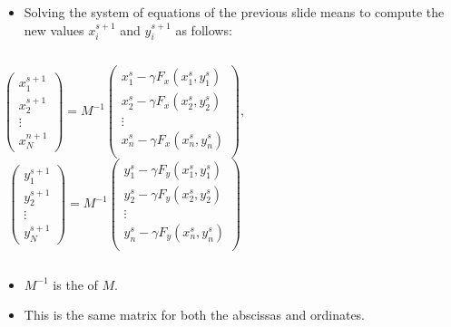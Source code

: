 \documentclass[10pt]{beamer}
\newcommand{\myemph}[1]{{\color{blue}{#1}}}
\begin{document}
 \begin{frame}
   \begin{itemize}
   \item Solving the system of equations of the previous slide means to compute the new
     values $x_i^{s+1}$ and $y_i^{s+1}$ as follows:
   \end{itemize}
   \begin{columns}
     {\small $$
       \begin{pmatrix}
         x^{s+1}_1\\x^{s+1}_2\\\vdots\\x^{n+1}_N
       \end{pmatrix}
       = M ^{-1} \begin{pmatrix}
         x^{s}_1 - \gamma F_x(x_1^{s},y_1^{s})\\
         x^{s}_2 - \gamma F_x(x_2^{s},y_2^{s})\\
         \vdots\\
         x^{s}_n - \gamma F_x(x_n^{s},y_n^{s})\\
       \end{pmatrix},
       $$}
     {\small $$ 
       \begin{pmatrix}
         y^{s+1}_1\\y^{s+1}_2\\\vdots\\y^{s+1}_N
       \end{pmatrix}
       = M^{-1} \begin{pmatrix}
         y^{s}_1 - \gamma F_y(x_1^{s},y_1^{s})\\
         y^{s}_2 - \gamma F_y(x_2^{s},y_2^{s})\\
         \vdots\\
         y^{s}_n - \gamma F_y(x_n^{s},y_n^{s})\\
       \end{pmatrix}
       $$}
   \end{columns}
   \begin{itemize}
   \item $M^{-1}$ is the \myemph{inverse matrix} of $M$.
   \item This is the same matrix for both the abscissas and ordinates.
   \end{itemize}
 \end{frame}
\end{document}
